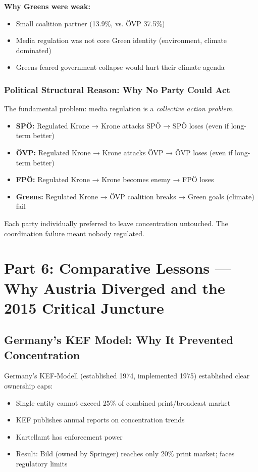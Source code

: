 {\textbf{Why Greens were weak:}
\begin{itemize}
\item Small coalition partner (13.9\%, vs. ÖVP 37.5\%)
\item Media regulation was not core Green identity (environment, climate dominated)
\item Greens feared government collapse would hurt their climate agenda
\end{itemize}

\subsubsection*{Political Structural Reason: Why No Party Could Act}

The fundamental problem: media regulation is a \textit{collective action problem}.

\begin{itemize}
\item \textbf{SPÖ:} Regulated Krone → Krone attacks SPÖ → SPÖ loses (even if long-term better)
\item \textbf{ÖVP:} Regulated Krone → Krone attacks ÖVP → ÖVP loses (even if long-term better)
\item \textbf{FPÖ:} Regulated Krone → Krone becomes enemy → FPÖ loses
\item \textbf{Greens:} Regulated Krone → ÖVP coalition breaks → Green goals (climate) fail
\end{itemize}

Each party individually preferred to leave concentration untouched. The coordination failure meant
nobody regulated.


\section*{Part 6: Comparative Lessons --- Why Austria Diverged and the 2015 Critical Juncture}

\subsection*{Germany's KEF Model: Why It Prevented Concentration}

Germany's KEF-Modell (established 1974, implemented 1975) established clear ownership caps:
\begin{itemize}
\item Single entity cannot exceed 25\% of combined print/broadcast market
\item KEF publishes annual reports on concentration trends
\item Kartellamt has enforcement power
\item Result: Bild (owned by Springer) reaches only 20\% print market; faces regulatory limits
\end{itemize}

}

